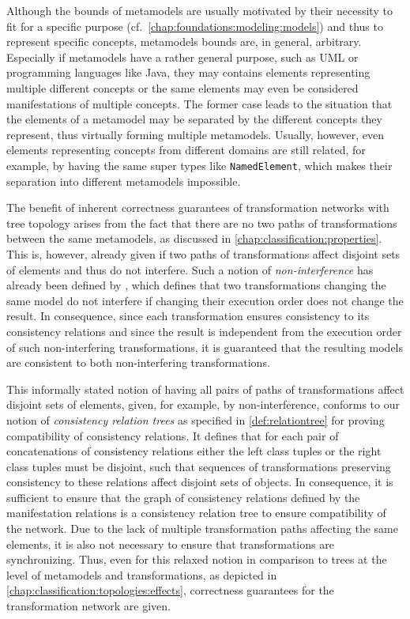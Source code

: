 Although the bounds of metamodels are usually motivated by their necessity to fit for a specific purpose (cf.\ \autoref{chap:foundations:modeling:models}) and thus to represent specific concepts, metamodels bounds are, in general, arbitrary.
Especially if metamodels have a rather general purpose, such as \gls{UML} or programming languages like Java, they may contains elements representing multiple different concepts or the same elements may even be considered manifestations of multiple concepts.
The former case leads to the situation that the elements of a metamodel may be separated by the different concepts they represent, thus virtually forming multiple metamodels.
Usually, however, even elements representing concepts from different domains are still related, for example, by having the same super types like \texttt{NamedElement}, which makes their separation into different metamodels impossible.

The benefit of inherent correctness guarantees of transformation networks with tree topology arises from the fact that there are no two paths of transformations between the same metamodels, as discussed in \autoref{chap:classification:properties}.
This is, however, already given if two paths of transformations affect disjoint sets of elements and thus do not interfere.
Such a notion of \emph{non-interference} has already been defined by \textcite{stevens2020BidirectionalTransformationLarge-SoSym}, which defines that two transformations changing the same model do not interfere if changing their execution order does not change the result.
In consequence, since each transformation ensures consistency to its consistency relations and since the result is independent from the execution order of such non-interfering transformations, it is guaranteed that the resulting models are consistent to both non-interfering transformations.

This informally stated notion of having all pairs of paths of transformations affect disjoint sets of elements, given, for example, by non-interference, conforms to our notion of \emph{consistency relation trees} as specified in \autoref{def:relationtree} for proving compatibility of consistency relations.
It defines that for each pair of concatenations of consistency relations either the left class tuples or the right class tuples must be disjoint, such that sequences of transformations preserving consistency to these relations affect disjoint sets of objects.
In consequence, it is sufficient to ensure that the graph of consistency relations defined by the manifestation relations is a consistency relation tree to ensure compatibility of the network.
Due to the lack of multiple transformation paths affecting the same elements, it is also not necessary to ensure that transformations are synchronizing.
Thus, even for this relaxed notion in comparison to trees at the level of metamodels and transformations, as depicted in \autoref{chap:classification:topologies:effects}, correctness guarantees for the transformation network are given.

